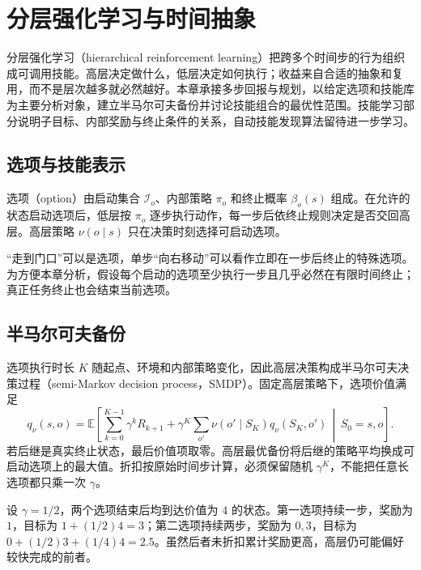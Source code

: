 \setcounter{chapter}{20} %
\chapter{分层强化学习与时间抽象}
\label{ch:rl-hierarchy}

分层强化学习（hierarchical reinforcement learning）把跨多个时间步的行为组织成可调用技能。高层决定做什么，低层决定如何执行；收益来自合适的抽象和复用，而不是层次越多就必然越好。本章承接多步回报与规划，以给定选项和技能库为主要分析对象，建立半马尔可夫备份并讨论技能组合的最优性范围。技能学习部分说明子目标、内部奖励与终止条件的关系，自动技能发现算法留待进一步学习。

\section{选项与技能表示}

选项（option）由启动集合 $\mathcal I_o$、内部策略 $\pi_o$ 和终止概率 $\beta_o(s)$ 组成。在允许的状态启动选项后，低层按 $\pi_o$ 逐步执行动作，每一步后依终止规则决定是否交回高层。高层策略 $\nu(o\mid s)$ 只在决策时刻选择可启动选项。

“走到门口”可以是选项，单步“向右移动”可以看作立即在一步后终止的特殊选项。为方便本章分析，假设每个启动的选项至少执行一步且几乎必然在有限时间终止；真正任务终止也会结束当前选项。

\section{半马尔可夫备份}

选项执行时长 $K$ 随起点、环境和内部策略变化，因此高层决策构成半马尔可夫决策过程（semi-Markov decision process，SMDP）。固定高层策略下，选项价值满足
\[
q_\nu(s,o)=\mathbb E\!\left[\sum_{k=0}^{K-1}\gamma^kR_{k+1}
+\gamma^K\sum_{o'}\nu(o'\mid S_K)q_\nu(S_K,o')\,\middle|\,S_0=s,o\right].
\]
若后继是真实终止状态，最后价值项取零。高层最优备份将后继的策略平均换成可启动选项上的最大值。折扣按原始时间步计算，必须保留随机 $\gamma^K$，不能把任意长选项都只乘一次 $\gamma$。

\begin{example}[持续时间改变价值]
设 $\gamma=1/2$，两个选项结束后均到达价值为 $4$ 的状态。第一选项持续一步，奖励为 $1$，目标为 $1+(1/2)4=3$；第二选项持续两步，奖励为 $0,3$，目标为 $0+(1/2)3+(1/4)4=2.5$。虽然后者未折扣累计奖励更高，高层仍可能偏好较快完成的前者。
\end{example}

